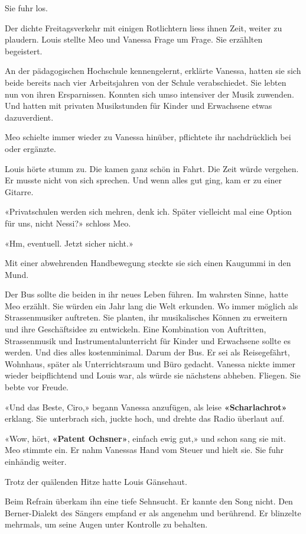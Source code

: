 Sie fuhr los.

Der dichte Freitagsverkehr mit einigen Rotlichtern liess ihnen Zeit,
weiter zu plaudern. Louis stellte Meo und Vanessa Frage um Frage. Sie
erzählten begeistert.

An der pädagogischen Hochschule kennengelernt, erklärte Vanessa, hatten
sie sich beide bereits nach vier Arbeitsjahren von der Schule
verabschiedet. Sie lebten nun von ihren Ersparnissen. Konnten sich umso
intensiver der Musik zuwenden. Und hatten mit privaten Musikstunden für
Kinder und Erwachsene etwas dazuverdient.

Meo schielte immer wieder zu Vanessa hinüber, pflichtete ihr
nachdrücklich bei oder ergänzte.

Louis hörte stumm zu. Die kamen ganz schön in Fahrt. Die Zeit würde
vergehen. Er musste nicht von sich sprechen. Und wenn alles gut ging,
kam er zu einer Gitarre.

«Privatschulen werden sich mehren, denk ich. Später vielleicht mal eine
Option für uns, nicht Nessi?» schloss Meo.

«Hm, eventuell. Jetzt sicher nicht.»

Mit einer abwehrenden Handbewegung steckte sie sich einen Kaugummi in
den Mund.

Der Bus sollte die beiden in ihr neues Leben führen. Im wahrsten Sinne,
hatte Meo erzählt. Sie würden ein Jahr lang die Welt erkunden. Wo immer
möglich als Strassenmusiker auftreten. Sie planten, ihr musikalisches
Können zu erweitern und ihre Geschäftsidee zu entwickeln. Eine
Kombination von Auftritten, Strassenmusik und Instrumentalunterricht für
Kinder und Erwachsene sollte es werden. Und dies alles kostenminimal.
Darum der Bus. Er sei als Reisegefährt, Wohnhaus, später als
Unterrichtsraum und Büro gedacht. Vanessa nickte immer wieder
beipflichtend und Louis war, als würde sie nächstens abheben. Fliegen.
Sie bebte vor Freude.

«Und das Beste, Ciro,» begann Vanessa anzufügen, als leise
\textbf{«Scharlachrot»} erklang. Sie unterbrach sich, juckte hoch, und
drehte das Radio überlaut auf.

«Wow, hört, \textbf{«Patent Ochsner»}, einfach ewig gut,» und schon sang
sie mit. Meo stimmte ein. Er nahm Vanessas Hand vom Steuer und hielt
sie. Sie fuhr einhändig weiter.

Trotz der quälenden Hitze hatte Louis Gänsehaut.

Beim Refrain überkam ihn eine tiefe Sehnsucht. Er kannte den Song nicht.
Den Berner-Dialekt des Sängers empfand er als angenehm und berührend. Er
blinzelte mehrmals, um seine Augen unter Kontrolle zu behalten.

